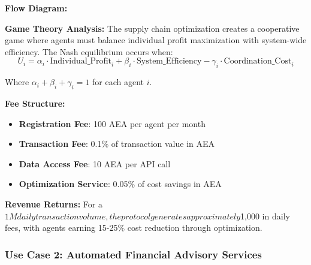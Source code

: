 \documentclass[12pt,a4paper]{article}
\begin{document}
\textbf{Flow Diagram:}
\begin{center}
\end{center}

\textbf{Game Theory Analysis:}
The supply chain optimization creates a cooperative game where agents must balance individual profit maximization with system-wide efficiency. The Nash equilibrium occurs when:
$$U_i = \alpha_i \cdot \text{Individual\_Profit}_i + \beta_i \cdot \text{System\_Efficiency} - \gamma_i \cdot \text{Coordination\_Cost}_i$$

Where $\alpha_i + \beta_i + \gamma_i = 1$ for each agent $i$.

\textbf{Fee Structure:}
\begin{itemize}
\item \textbf{Registration Fee}: 100 AEA per agent per month
\item \textbf{Transaction Fee}: 0.1\% of transaction value in AEA
\item \textbf{Data Access Fee}: 10 AEA per API call
\item \textbf{Optimization Service}: 0.05\% of cost savings in AEA
\end{itemize}

\textbf{Revenue Returns:}
For a $1M daily transaction volume, the protocol generates approximately $1,000 in daily fees, with agents earning 15-25\% cost reduction through optimization.

\subsubsection{Use Case 2: Automated Financial Advisory Services}
\end{document}
